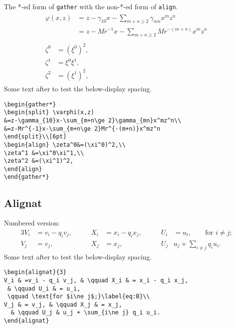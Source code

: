 The *-ed form of {\tt gather} with the non-*-ed form of
{\tt align}.
\begin{gather*}
\begin{split} \varphi(x,z)
&=z-\gamma_{10}x-\sum_{m+n\ge 2}\gamma_{mn}x^mz^n\\
&=z-Mr^{-1}x-\sum_{m+n\ge 2}Mr^{-(m+n)}x^mz^n
\end{split}\\[6pt]
\begin{align} \zeta^0&=(\xi^0)^2,\\
\zeta^1 &=\xi^0\xi^1,\\
\zeta^2 &=(\xi^1)^2,
\end{align}
\end{gather*}
Some text after to test the below-display spacing.

\begin{verbatim}
\begin{gather*}
\begin{split} \varphi(x,z)
&=z-\gamma_{10}x-\sum_{m+n\ge 2}\gamma_{mn}x^mz^n\\
&=z-Mr^{-1}x-\sum_{m+n\ge 2}Mr^{-(m+n)}x^mz^n
\end{split}\\[6pt]
\begin{align} \zeta^0&=(\xi^0)^2,\\
\zeta^1 &=\xi^0\xi^1,\\
\zeta^2 &=(\xi^1)^2,
\end{align}
\end{gather*}
\end{verbatim}

\newpage
\subsection{Alignat}
Numbered version:
\begin{alignat}{3}
V_i & =v_i - q_i v_j, & \qquad X_i & = x_i - q_i x_j,
 & \qquad U_i & = u_i, 
 \qquad \text{for $i\ne j$;}\label{eq:B}\\
V_j & = v_j, & \qquad X_j & = x_j,
  & \qquad U_j & u_j + \sum_{i\ne j} q_i u_i.
\end{alignat}
Some text after to test the below-display spacing.

\begin{verbatim}
\begin{alignat}{3}
V_i & =v_i - q_i v_j, & \qquad X_i & = x_i - q_i x_j,
 & \qquad U_i & = u_i, 
 \qquad \text{for $i\ne j$;}\label{eq:B}\\
V_j & = v_j, & \qquad X_j & = x_j,
  & \qquad U_j & u_j + \sum_{i\ne j} q_i u_i.
\end{alignat}
\end{verbatim}


